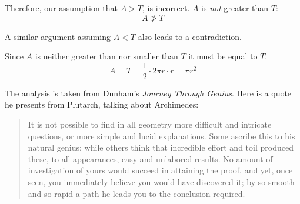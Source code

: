 \documentclass[11pt, oneside]{article}
\begin{document}
Therefore, our assumption that $A > T$, is incorrect.  $A$ is \emph{not} greater than $T$:
\[ A \ngtr T \]

A similar argument assuming $A < T$ also leads to a contradiction.  

Since $A$ is neither greater than nor smaller than $T$ it must be equal to $T$.
\[ A = T = \frac{1}{2} \cdot 2 \pi r \cdot r  = \pi r^2 \]

The analysis is taken from Dunham's \emph{Journey Through Genius}.  Here is a quote he presents from Plutarch, talking about Archimedes:

\begin{quote}It is not possible to find in all geometry more difficult and intricate questions, or more simple and lucid explanations. Some ascribe this to his natural genius; while others think that incredible effort and toil produced these, to all appearances, easy and unlabored results. No amount of investigation of yours would succeed in attaining the proof, and yet, once seen, you immediately believe you would have discovered it; by so smooth and so rapid a path he leads you to the conclusion required.\end{quote}
\end{document}
